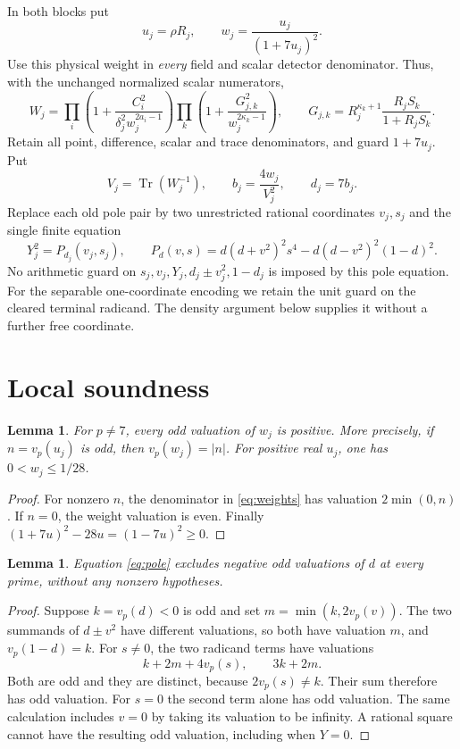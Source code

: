 \documentclass[11pt,a4paper]{article}
\newtheorem{lemma}[theorem]{Lemma}
\DeclareMathOperator{\Tr}{Tr}
\begin{document}
In both blocks put
\begin{equation}\label{eq:weights}
 u_j=\rho R_j,\qquad w_j=\frac{u_j}{(1+7u_j)^2}.
\end{equation}
Use this physical weight in \emph{every} field and scalar detector
denominator. Thus, with the unchanged normalized scalar numerators,
\[
 W_j=\prod_i\left(1+\frac{C_i^2}
                           {\delta_j^2w_j^{2a_i-1}}\right)
     \prod_k\left(1+\frac{G_{j,k}^2}
                           {w_j^{2\kappa_k-1}}\right),
 \qquad
 G_{j,k}=R_j^{\kappa_k+1}\frac{R_jS_k}{1+R_jS_k}.
\]
Retain all point, difference, scalar and trace denominators, and
guard \(1+7u_j\). Put
\[
 V_j=\Tr(W_j^{-1}),\qquad b_j=\frac{4w_j}{V_j^2},\qquad d_j=7b_j.
\]
Replace each old pole pair by two unrestricted rational coordinates
\(v_j,s_j\) and the single finite equation
\begin{equation}\label{eq:pole}
 Y_j^2=P_{d_j}(v_j,s_j),\qquad
 P_d(v,s)=d(d+v^2)^2s^4-d(d-v^2)^2(1-d)^2.
\end{equation}
No arithmetic guard on \(s_j,v_j,Y_j,d_j\pm v_j^2,1-d_j\) is imposed
by this pole equation. For the separable one-coordinate encoding we
retain the unit guard on the cleared terminal radicand. The density
argument below supplies it without a further free coordinate.

\section{Local soundness}

\begin{lemma}\label{lem:weight}
For \(p\ne7\), every odd valuation of \(w_j\) is positive.
More precisely, if \(n=v_p(u_j)\) is odd, then
\(v_p(w_j)=|n|\). For positive real \(u_j\), one has
\(0<w_j\le1/28\).
\end{lemma}
\begin{proof}
For nonzero \(n\), the denominator in \eqref{eq:weights} has
valuation \(2\min(0,n)\). If \(n=0\), the weight valuation is
even. Finally \((1+7u)^2-28u=(1-7u)^2\ge0\).
\end{proof}

\begin{lemma}\label{lem:pole}
Equation \eqref{eq:pole} excludes negative odd valuations of \(d\)
at every prime, without any nonzero hypotheses.
\end{lemma}
\begin{proof}
Suppose \(k=v_p(d)<0\) is odd and set
\(m=\min(k,2v_p(v))\). The two summands of \(d\pm v^2\)
have different valuations, so both have valuation \(m\), and
\(v_p(1-d)=k\). For \(s\ne0\), the two radicand terms have
valuations
\[
 k+2m+4v_p(s),\qquad 3k+2m.
\]
Both are odd and they are distinct, because \(2v_p(s)\ne k\).
Their sum therefore has odd valuation. For \(s=0\) the second
term alone has odd valuation. The same calculation includes \(v=0\)
by taking its valuation to be infinity. A rational square cannot
have the resulting odd valuation, including when \(Y=0\).
\end{proof}
\end{document}
